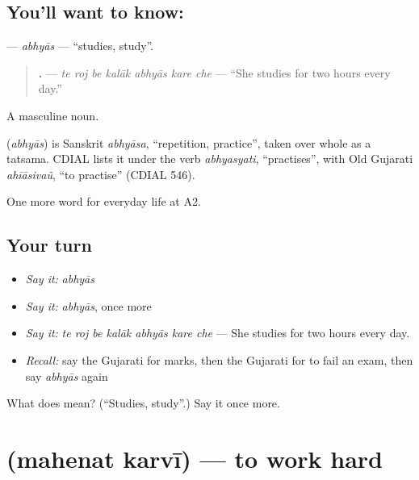 \subsection*{You'll want to know: }
\textbf{} — \emph{abhyās} — \textquotedblleft{}studies, study\textquotedblright{}.

\begin{quote}
\textbf{      .} — \emph{te roj be kalāk abhyās kare che} — \textquotedblleft{}She studies for two hours every day.\textquotedblright{}
\end{quote}

A masculine noun.

\begin{cousinweb}
\textbf{} (\emph{abhyās}) is Sanskrit \emph{abhyāsa}, \textquotedblleft{}repetition, practice\textquotedblright{}, taken over whole as a tatsama. CDIAL lists it under the verb \emph{abhyasyati}, \textquotedblleft{}practises\textquotedblright{}, with Old Gujarati \emph{ahīāsivaũ}, \textquotedblleft{}to practise\textquotedblright{} (CDIAL 546).
\end{cousinweb}

\begin{grammarlens}[title={What you've built}]
One more word for everyday life at A2.
\end{grammarlens}

\subsection*{Your turn}
\begin{itemize}
\raggedright
  \item \emph{Say it:} \emph{abhyās}
  \item \emph{Say it:} \emph{abhyās}, once more
  \item \emph{Say it:} \emph{te roj be kalāk abhyās kare che} — She studies for two hours every day.
  \item \emph{Recall:} say the Gujarati for marks, then the Gujarati for to fail an exam, then say \emph{abhyās} again
\end{itemize}

\begin{tcolorbox}[breakable,colback=teal!4,colframe=teal!35!black,title={Before you move on}]
What does  mean? (\textquotedblleft{}Studies, study\textquotedblright{}.) Say it once more.
\end{tcolorbox}
\section[\texorpdfstring{\gu{મહેનત} \gu{કરવી} (mahenat karvī)}{મહેનત કરવી (mahenat karvī)}]{  (mahenat karvī) — to work hard}


